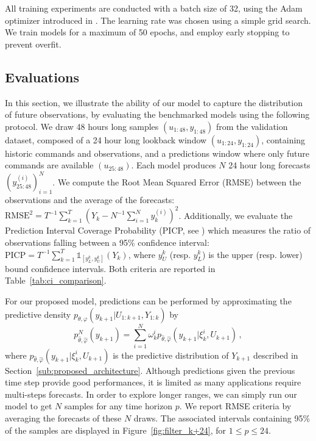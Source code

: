 \documentclass[conference]{IEEEtran}
\begin{document}
All training experiments are conducted with a batch size of 32, using the Adam optimizer introduced in \cite{Kingma2015AdamAM}.
The learning rate was chosen using a simple grid search.
We train models for a maximum of 50 epochs, and employ early stopping to prevent overfit.

\subsection{Evaluations}%
\label{sub:evaluations}

In this section, we illustrate the ability of our model to capture the distribution of future observations, by evaluating the benchmarked models using the following protocol. We draw 48 hours long samples $(u_{1:48}, y_{1:48})$ from the validation dataset, composed of a 24 hour long lookback window $(u_{1:24}, y_{1:24})$, containing historic commands and observations, and a predictions window where only future commands are available $(u_{25:48})$.
Each model produces $N$ 24 hour long forecasts $(y_{25:48}^{(i)})_{i=1}^N$.
We compute the Root Mean Squared Error (RMSE) between the observations and the average of the forecasts: $\mathrm{RMSE}^2 = T^{-1} \sum_{k=1}^T (Y_k - N^{-1} \sum_{i=1}^N y_k^{(i)})^2$.
Additionally, we evaluate the Prediction Interval Coverage Probability (PICP, see \cite{Durga2006PICP}) which measures the ratio of observations falling between a 95\% confidence interval: $\mathrm{PICP} = T^{-1} \sum^{T}_{k=1} \mathbb{1}_{[y_L^k, y_U^k]}(Y_k)$, where $y_U^k$ (resp. $y_L^k$) is the upper (resp. lower) bound confidence intervals.
Both criteria are reported in Table~\ref{tab:ci_comparison}.

For our proposed model, predictions can be performed by approximating the predictive density $p_{\theta,\varphi}(y_{k+1}|U_{1:k+1},Y_{1:k})$ by
$$
	p^N_{\widehat\theta,\widehat\varphi}(y_{k+1})= \sum_{i=1}^{N}\omega_k^i p_{\widehat\theta,\widehat\varphi}(y_{k+1}|\xi_k^i,U_{k+1})\,,
$$
where $ p_{\widehat\theta,\widehat\varphi}(y_{k+1}|\xi_k^i,U_{k+1})$ is the predictive distribution of $Y_{k+1}$ described in Section~\ref{sub:proposed_architecture}.
Although predictions given the previous time step provide good performances, it is limited as many applications require multi-steps forecasts.
In order to explore longer ranges, we can simply run our model to get $N$ samples for any time horizon $p$.
We report RMSE criteria by averaging the forecasts of these $N$ draws.
The associated intervals containing 95\% of the samples are displayed in Figure~\ref{fig:filter_k+24}, for $1\leq p \leq 24$.
\end{document}

